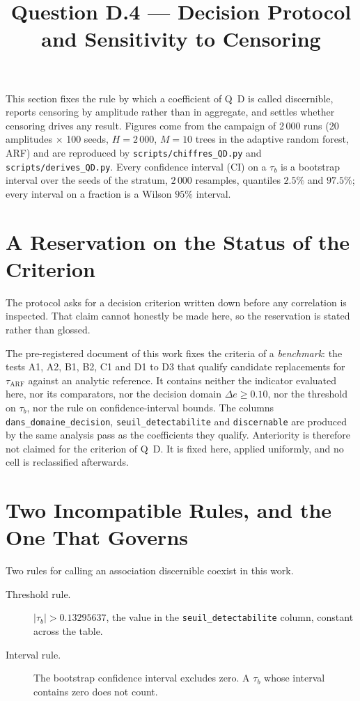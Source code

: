 \documentclass[11pt,a4paper]{article}
\title{Question D.4 --- Decision Protocol and Sensitivity to Censoring}
\author{}
\date{}
\begin{document}
\maketitle

\noindent This section fixes the rule by which a coefficient of Q~D is called discernible,
reports censoring by amplitude rather than in aggregate, and settles whether censoring
drives any result. Figures come from the campaign of 2\,000 runs (20 amplitudes $\times$
100 seeds, $H = 2\,000$, $M = 10$ trees in the adaptive random forest, ARF) and are
reproduced by \texttt{scripts/chiffres\_QD.py} and \texttt{scripts/derives\_QD.py}. Every
confidence interval (CI) on a $\tau_b$ is a bootstrap interval over the seeds of the
stratum, $2\,000$ resamples, quantiles $2.5\%$ and $97.5\%$; every interval on a fraction
is a Wilson $95\%$ interval.

\section{A Reservation on the Status of the Criterion}

The protocol asks for a decision criterion written down before any correlation is
inspected. That claim cannot honestly be made here, so the reservation is stated rather
than glossed.

The pre-registered document of this work fixes the criteria of a \emph{benchmark}: the
tests A1, A2, B1, B2, C1 and D1 to D3 that qualify candidate replacements for
$\tau_{\mathrm{ARF}}$ against an analytic reference. It contains neither the indicator
evaluated here, nor its comparators, nor the decision domain $\Delta e \ge 0.10$, nor the
threshold on $\tau_b$, nor the rule on confidence-interval bounds. The columns
\texttt{dans\_domaine\_decision}, \texttt{seuil\_detectabilite} and \texttt{discernable}
are produced by the same analysis pass as the coefficients they qualify. Anteriority is
therefore not claimed for the criterion of Q~D. It is fixed here, applied uniformly, and no
cell is reclassified afterwards.

\section{Two Incompatible Rules, and the One That Governs}

Two rules for calling an association discernible coexist in this work.

\begin{description}
  \item[Threshold rule.] $|\tau_b| > 0.13295637$, the value in the
    \texttt{seuil\_detectabilite} column, constant across the table.
  \item[Interval rule.] The bootstrap confidence interval excludes zero. A $\tau_b$ whose
    interval contains zero does not count.
\end{description}
\end{document}

